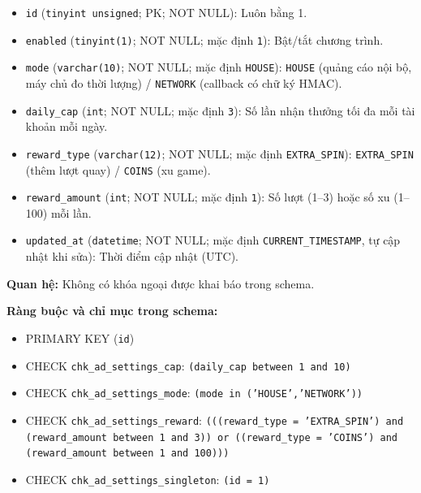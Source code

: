 \begin{itemize}

\item \texttt{id} (\texttt{tinyint unsigned}; PK; NOT NULL): Luôn bằng 1.

\item \texttt{enabled} (\texttt{tinyint(1)}; NOT NULL; mặc định \texttt{1}): Bật/tắt chương trình.

\item \texttt{mode} (\texttt{varchar(10)}; NOT NULL; mặc định \texttt{HOUSE}): \texttt{HOUSE} (quảng cáo nội bộ, máy chủ đo thời lượng) / \texttt{NETWORK} (callback có chữ ký HMAC).

\item \texttt{daily\_cap} (\texttt{int}; NOT NULL; mặc định \texttt{3}): Số lần nhận thưởng tối đa mỗi tài khoản mỗi ngày.

\item \texttt{reward\_type} (\texttt{varchar(12)}; NOT NULL; mặc định \texttt{EXTRA\_SPIN}): \texttt{EXTRA\_SPIN} (thêm lượt quay) / \texttt{COINS} (xu game).

\item \texttt{reward\_amount} (\texttt{int}; NOT NULL; mặc định \texttt{1}): Số lượt (1–3) hoặc số xu (1–100) mỗi lần.

\item \texttt{updated\_at} (\texttt{datetime}; NOT NULL; mặc định \texttt{CURRENT\_TIMESTAMP}, tự cập nhật khi sửa): Thời điểm cập nhật (UTC).

\end{itemize}

\textbf{Quan hệ:} Không có khóa ngoại được khai báo trong schema.

\textbf{Ràng buộc và chỉ mục trong schema:}

\begin{itemize}

\item PRIMARY KEY (\texttt{id})

\item CHECK \texttt{chk\_ad\_settings\_cap}: \texttt{(daily\_cap between 1 and 10)}

\item CHECK \texttt{chk\_ad\_settings\_mode}: \texttt{(mode in ('HOUSE','NETWORK'))}

\item CHECK \texttt{chk\_ad\_settings\_reward}: \texttt{(((reward\_type = 'EXTRA\_SPIN') and (reward\_amount between 1 and 3)) or ((reward\_type = 'COINS') and (reward\_amount between 1 and 100)))}

\item CHECK \texttt{chk\_ad\_settings\_singleton}: \texttt{(id = 1)}

\end{itemize}

